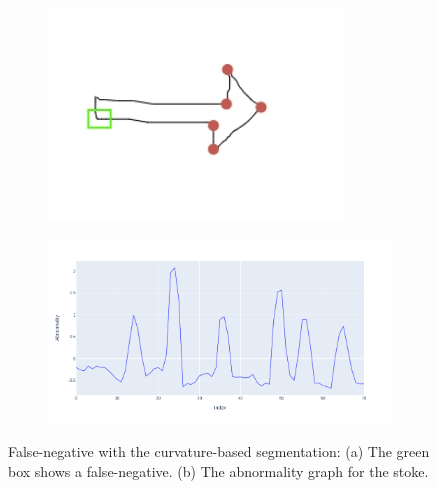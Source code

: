 \begin{figure}
	\centering
	\begin{subfigure}{0.45\textwidth}
		\centering
		\includegraphics[scale=0.5]{./img/seg_results_arrow_missing.jpg}
		\caption{}
	\end{subfigure}
	\hfill
	\begin{subfigure}{0.45\textwidth}
		\centering
		\includegraphics[scale=0.25]{./img/seg_abnormality_arrow_missing}
		\caption{}
	\end{subfigure}
	\caption{False-negative with the curvature-based segmentation: (a) The green box shows a false-negative. (b) The abnormality graph for the stoke.}
	\label{fig:seg_false_negative}
\end{figure}

